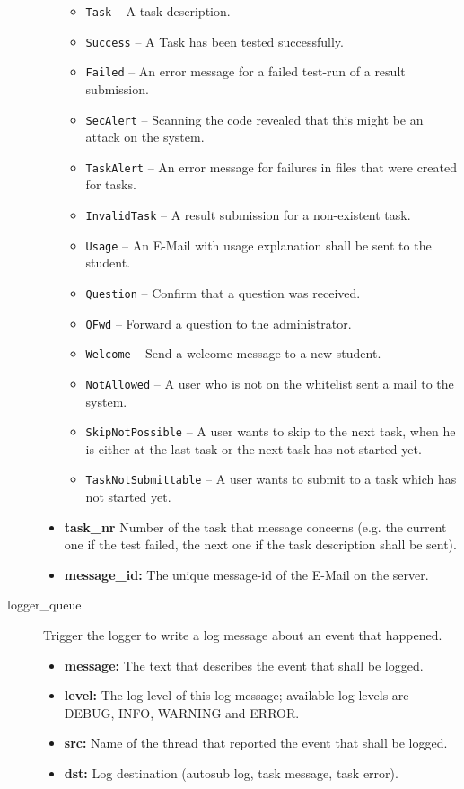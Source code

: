 \begin{description}
\begin{itemize}
            \begin{itemize}
				\item {\tt Task} -- A task description.
				\item {\tt Success} -- A Task has been tested successfully.
				\item {\tt Failed} -- An error message for a failed test-run of a result 
					submission.
				\item {\tt SecAlert} -- Scanning the code revealed that this might be an 
					attack on the system.
				\item {\tt TaskAlert} -- An error message for failures in files that were 
					created for tasks.
				\item {\tt InvalidTask} -- A result submission for a non-existent task.
				\item {\tt Usage} -- An E-Mail with usage explanation shall be sent to the 
					student. 
				\item {\tt Question} -- Confirm that a question was received.
				\item {\tt QFwd} -- Forward a question to the administrator.
				\item {\tt Welcome} -- Send a welcome message to a new student.
				\item {\tt NotAllowed} -- A user who is not on the whitelist sent a mail 
					to the system.
				\item {\tt SkipNotPossible} -- A user wants to skip to the next
					task, when he is either at the last task or the next task has not 
					started yet.
				\item {\tt TaskNotSubmittable} -- A user wants to submit to a task
					which has not started yet.
            \end{itemize}

        \item {\bf task\_nr} Number of the task that message concerns (e.g. the current 
			one if the test failed, the next one if the task description shall be sent).
        \item {\bf message\_id:} The unique message-id of the E-Mail on the server.
    \end{itemize}

\item [logger\_queue] Trigger the logger to write a log message about an event that happened.
    \begin{itemize}
        \item {\bf message:} The text that describes the event that shall be logged.
        \item {\bf level:} The log-level of this log message; available log-levels 
			are DEBUG, INFO, WARNING and ERROR.
        \item {\bf src:} Name of the thread that reported the event that shall be logged.
		\item {\bf dst:} Log destination (autosub log, task message, task error).
    \end{itemize}


\end{description}

